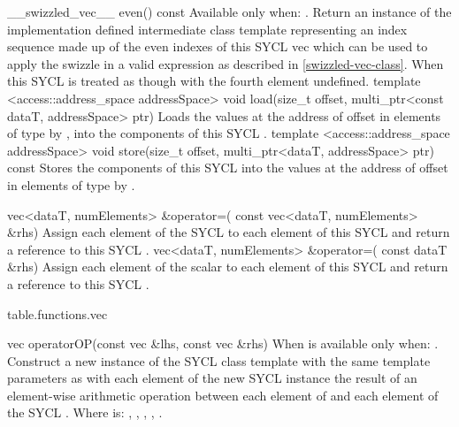   \addRow
    {\__swizzled_vec__ even() const}
    {
      Available only when: .
      Return an instance of the implementation defined intermediate class template  representing an index sequence made up of the even indexes of this SYCL vec which can be used to apply the swizzle in a valid expression as described in \ref{swizzled-vec-class}. When  this SYCL  is treated as though  with the fourth element undefined.
    }
  \addRowTwoL
  {template <access::address_space addressSpace>}
  {void load(size_t offset, multi_ptr<const dataT, addressSpace> ptr)}
  {
    Loads the values at the address of  offset in elements of type  by , into the components of this SYCL .
  }
  \addRowTwoL
  {template <access::address_space addressSpace>}
  {void store(size_t offset, multi_ptr<dataT, addressSpace> ptr) const}
  {
    Stores the components of this SYCL  into the values at the address of  offset in elements of type  by .
  }

  \addRowTwoL
    {vec<dataT, numElements> \&operator=(}
    {  const vec<dataT, numElements> \&rhs)}
    {
      Assign each element of the  SYCL  to each element of this SYCL  and return a reference to this SYCL .
    }
  \addRowTwoL
    {vec<dataT, numElements> \&operator=(}
    {  const dataT \&rhs)}
    {
      Assign each element of the  scalar to each element of this SYCL  and return a reference to this SYCL .
    }
 \completeTable

{table.functions.vec}

  \addRow
  {vec operatorOP(const vec \&lhs, const vec \&rhs)}
  {
    When  is \codeinline{\%} available only when: .
    \newline
    Construct a new instance of the SYCL  class template with the same template parameters as   with each element of the new SYCL  instance the result of an element-wise  arithmetic operation between each element of   and each element of the  SYCL .
    \newline \newline
    Where  is: \codeinline{+}, \codeinline{-}, \codeinline{*}, \codeinline{/}, \codeinline{\%}.
  }

